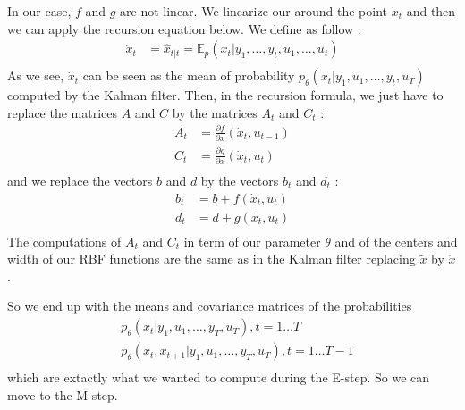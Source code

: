 In our case, $f$ and $g$ are not linear.
We linearize our around the point $\dot{x}_t$ and then we can apply the recursion equation below.
We define  as follow :
\begin{align*}
  \dot{x}_t &= \hat{x}_{t|t} = \mathbb{E}_p(x_t|y_1, \ldots , y_t, u_1, \ldots , u_t) \\
\end{align*}
As we see, $\dot{x}_t$ can be seen as the mean of probability  $p_{\theta}\left(x_t|y_1, u_1, \ldots, y_t, u_T \right )$ computed by the Kalman filter.
Then, in the recursion formula, we just have to replace the matrices $A$ and $C$  by the matrices $A_t$ and $C_t$ :
\begin{align*}
  A_t &= \frac{\partial f}{\partial x}(\dot{x}_t, u_{t-1})\\
  C_t &= \frac{\partial g}{\partial x}(\dot{x}_t, u_t)\\
\end{align*}
and we replace the vectors $b$ and $d$ by the vectors $b_t$ and $d_t$ :
\begin{align*}
  b_t &= b + f(\dot{x}_t, u_t)\\
  d_t &= d + g(\dot{x}_t, u_t)\\
\end{align*}
The computations of $A_t$ and $C_t$ in term of our parameter $\theta$  and of the centers and width of our RBF functions are the same as in the Kalman filter replacing $\tilde{x}$ by $\dot{x}$.

So we end up with the means and covariance matrices of the probabilities
\begin{align*}
  &p_{\theta}\left(x_t|y_1, u_1, \ldots, y_T, u_T \right ), t=1 \ldots T\\
  &p_{\theta}\left(x_t, x_{t+1}|y_1, u_1, \ldots, y_T, u_T \right ), t=1 \ldots T-1\\
\end{align*}
which are extactly what we wanted to compute during the E-step.
So we can move to the M-step.
